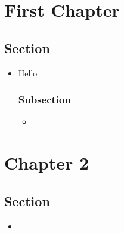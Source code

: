 \documentclass{inVerba-notes}
\begin{document}
\tableofcontents

\chapter{First Chapter}
\section{Section}
\begin{itemize}
    \item Hello
    \subsection{Subsection}
    \begin{itemize}
        \item
    \end{itemize}
\end{itemize}
\chapter{Chapter 2}
\section{Section}
\begin{itemize}
    \item 
\end{itemize}
\end{document}
